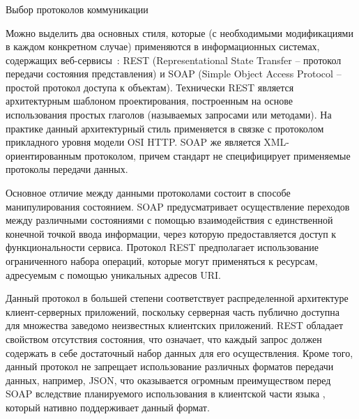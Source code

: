 \subsubsection{} Выбор протоколов коммуникации
\label{sec:design:server:protocols}

Можно выделить два основных стиля, которые (с необходимыми модификациями в каждом конкретном случае) применяются в информационных системах, содержащих веб-сервисы~\cite{applicationArchitectureGuide}: REST (Representational State Transfer -- протокол передачи состояния представления) и SOAP (Simple Object Access Protocol -- простой протокол доступа к объектам). Технически REST является архитектурным шаблоном проектирования, построенным на основе использования простых глаголов (называемых запросами или методами). На практике данный архитектурный стиль применяется в связке с протоколом прикладного уровня модели OSI HTTP. SOAP же является XML-ориентированным протоколом, причем стандарт не специфицирует применяемые протоколы передачи данных.

Основное отличие между данными протоколами состоит в способе манипулирования состоянием. SOAP предусматривает осуществление переходов между различными состояниями с помощью взаимодействия с единственной конечной точкой ввода информации, через которую предоставляется доступ к функциональности сервиса. Протокол REST предполагает использование ограниченного набора операций, которые могут применяться к ресурсам, адресуемым с помощью уникальных адресов URI. 

Данный протокол в большей степени соответствует распределенной архитектуре клиент-серверных приложений, поскольку серверная часть публично доступна для множества заведомо неизвестных клиентских приложений. REST обладает свойством отсутствия состояния, что означает, что каждый запрос должен содержать в себе достаточный набор данных для его осуществления. Кроме того, данный протокол не запрещает использование различных форматов передачи данных, например, JSON, что оказывается огромным преимуществом перед SOAP вследствие планируемого использования в клиентской части языка \typescript, который нативно поддерживает данный формат.
